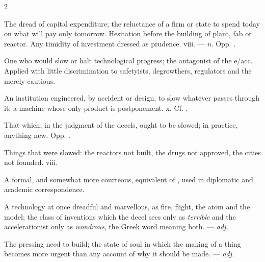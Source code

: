 \begin{multicols}{2}

 The dread of capital expenditure; the reluctance of a firm or state to spend today on what will pay only tomorrow.   Hesitation before the building of plant, fab or reactor.   Any timidity of investment dressed as prudence.   viii. —  \textit{n.} Opp. .

  One who would slow or halt technological progress; the antagonist of the e/acc. Applied with little discrimination to safetyists, degrowthers, regulators and the merely cautious.

 An institution engineered, by accident or design, to slow whatever passes through it; a machine whose only product is postponement.   x. Cf. .

 That which, in the judgment of the decels, ought to be slowed; in practice, anything new. Opp. .

  Things that were slowed: the reactors not built, the drugs not approved, the cities not founded.   viii.

 A formal, and somewhat more courteous, equivalent of , used in diplomatic and academic correspondence.

 A technology at once dreadful and marvellous, as fire, flight, the atom and the model; the class of inventions which the decel sees only as \textit{terrible} and the accelerationist only as \textit{wondrous}, the Greek word meaning both. —  \textit{adj.}

 The pressing need to build; the state of soul in which the making of a thing becomes more urgent than any account of why it should be made.  —  \textit{adj.}


\end{multicols}

